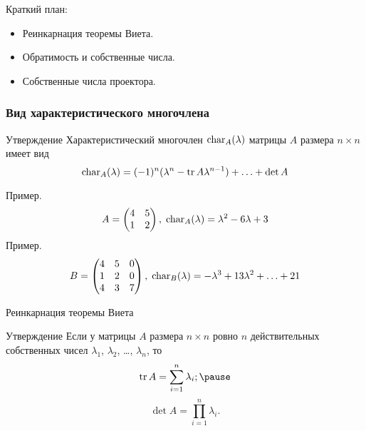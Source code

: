 
\begin{frame} %


\end{frame}



\begin{frame}{Краткий план:}
  \begin{itemize}[<+->]
    \item Реинкарнация теоремы Виета. 
    \item Обратимость и собственные числа.
    \item Собственные числа проектора.
  \end{itemize}

\end{frame}




\begin{frame}
    \frametitle{Вид характеристического многочлена}


    \begin{block}{Утверждение}
        Характеристический многочлен $\operatorname{char}_A(\lambda)$ матрицы $A$ размера $n\times n$ имеет вид
        \[
            \charp_A(\lambda) = (-1)^n (\lambda^n - \trace A \lambda^{n-1}) + \ldots + \det A
        \]
        
    \end{block}
    \pause

    Пример. 
    \[
        A= \begin{pmatrix}
            4 & 5 \\
            1 & 2 \\
        \end{pmatrix}, \; \operatorname{char}_A(\lambda) = \lambda^2 - 6 \lambda + 3
    \]
    \pause
    Пример.
\[
    B= \begin{pmatrix}
        4 & 5 & 0 \\
        1 & 2 & 0 \\
        4 & 3 & 7 \\
    \end{pmatrix}, \; \operatorname{char}_B(\lambda) = -\lambda^3 + 13 \lambda^2 + \ldots + 21
\]


\end{frame}


\begin{frame}{Реинкарнация теоремы Виета}
\begin{block}{Утверждение}
    Если у матрицы $A$ размера $n\times n$ ровно $n$ действительных собственных чисел $\lambda_1$, 
    $\lambda_2$, \ldots, $\lambda_n$, то \pause
    \[
    \trace A = \sum_{i=1}^n \lambda_i; \pause
    \]
    \[
    \det A = \prod_{i=1}^n \lambda_i.   
    \]
\end{block}

\end{frame}

